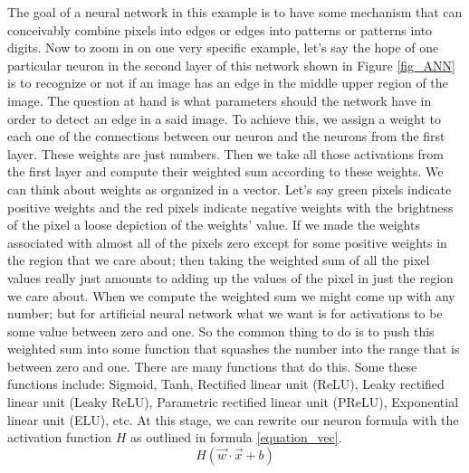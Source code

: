 \documentclass[master]{thesis-uestc}
\begin{document}
The goal of a neural network in this example is to have some mechanism that can conceivably combine pixels into edges or edges into patterns or patterns into digits. Now to zoom in on one very specific example, let's say the hope of one particular neuron in the second layer of this network shown in Figure \ref{fig_ANN} is to recognize or not if an image has an edge in the middle upper region of the image. The question at hand is what parameters should the network have in order to detect an edge in a said image. To achieve this, we assign a weight to each one of the connections between our neuron and the neurons from the first layer. These weights are just numbers. Then we take all those activations from the first layer and compute their weighted sum according to these weights. We can think about weights as organized in a vector. Let's say green pixels indicate positive weights and the red pixels indicate negative weights with the brightness of the pixel a loose depiction of the weights’ value. If we made the weights associated with almost all of the pixels zero except for some positive weights in the region that we care about; then taking the weighted sum of all the pixel values really just amounts to adding up the values of the pixel in just the region we care about. When we compute the weighted sum we might come up with any number; but for artificial neural network what we want is for activations to be some value between zero and one. So the common thing to do is to push this weighted sum into some function that squashes the number into the range that is between zero and one. There are many functions that do this. Some these functions include: Sigmoid, Tanh, Rectified linear unit (ReLU), Leaky rectified linear unit (Leaky ReLU), Parametric rectified linear unit (PReLU), Exponential linear unit (ELU), etc. At this stage, we can rewrite our neuron formula with the activation function $H$ as outlined in formula \ref{equation_vec}.
\begin{equation}
    H(\vec{w} \cdot \vec{x} + b)
\label{equation_vec}
\end{equation}
\end{document}
